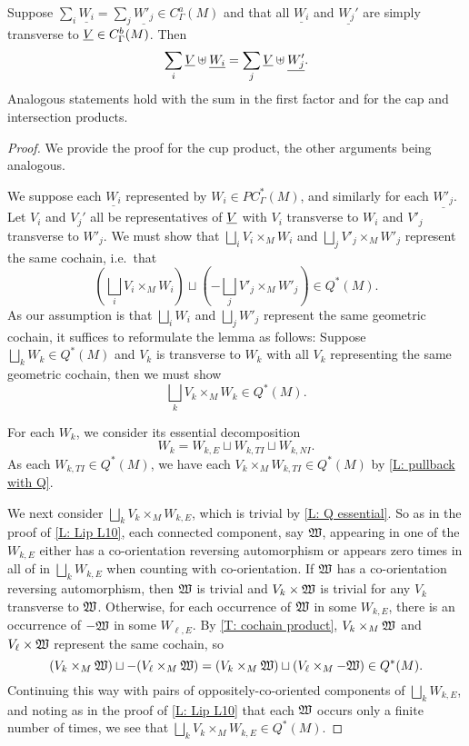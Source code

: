 \begin{proposition}\label{P: multicup}
Suppose $\sum_i \underline{W_i}=\sum_j \underline{W'_j}\in C_\Gamma^a(M)$ and that all $\underline{W_i}$ and $\underline{W_j'}$ are simply transverse to $\underline{V}\in C_\Gamma^b(M)$. Then $$\sum_i \underline{V} \uplus \underline{W_i}=\sum_j \underline{V}\uplus \underline{W'_j}.$$
Analogous statements hold with the sum in the first factor and for the cap and intersection products.
\end{proposition}
\begin{proof}
We provide the proof for the cup product, the other arguments being analogous.

We suppose each $\underline{W_i}$ represented by $W_i\in PC^*_\Gamma(M)$, and similarly for each $\underline{W'_j}$. Let $V_i$ and $V_j'$ all be representatives of $\underline{V}$ with $V_i$ transverse to $W_i$ and $V'_j$ transverse to $W'_j$. We must show that $\bigsqcup_i V_i\times_M W_i$ and $\bigsqcup_j V'_j\times_MW'_j$ represent the same cochain, i.e.\ that $$\left(\bigsqcup_i V_i\times_M W_i\right) \sqcup \left(-\bigsqcup_j V'_j\times_MW'_j\right)\in Q^*(M).$$
As our assumption is that $\bigsqcup_i W_i$ and $\bigsqcup_j W'_j$ represent the same geometric cochain, it suffices to reformulate the lemma as follows: Suppose $\bigsqcup_k W_k\in Q^*(M)$ and $V_k$ is transverse to $W_k$ with all $V_k$ representing the same geometric cochain, then we must show
 $$\bigsqcup_k V_k\times_M W_k \in Q^*(M).$$

For each $W_k$, we consider its essential decomposition $$W_k=W_{k,E}\sqcup W_{k,TI}\sqcup W_{k,NI}.$$
As each $W_{k,TI}\in Q^*(M)$, we have each $V_k\times_M W_{k,TI}\in Q^*(M)$ by \cref{L: pullback with Q}.

We next consider $\bigsqcup_k V_k\times_MW_{k,E}$, which is trivial by \cref{L: Q essential}. So as in the proof of \cref{L: Lip L10}, each connected component, say $\mathfrak W$, appearing in one of the $W_{k,E}$ either has a co-orientation reversing automorphism or appears zero times in all of in $\bigsqcup_k W_{k,E}$ when counting with co-orientation. If $\mathfrak W$ has a co-orientation reversing automorphism, then $\mathfrak W$ is trivial and $V_k\times \mathfrak W$ is trivial for any $V_k$ transverse to $\mathfrak W$. Otherwise, for each occurrence of $\mathfrak W$ in some $W_{k,E}$, there is an occurrence of $-\mathfrak W$ in some $W_{\ell,E}$. By \cref{T: cochain product}, $V_k\times_M\mathfrak W$ and $V_\ell\times \mathfrak W$ represent the same cochain, so
$$(V_k\times_M\mathfrak W)\sqcup -(V_\ell\times_M\mathfrak W)=(V_k\times_M\mathfrak W)\sqcup(V_\ell\times_M-\mathfrak W)\in Q^*(M).$$
Continuing this way with pairs of oppositely-co-oriented components of $\bigsqcup_k W_{k,E}$, and noting as in the proof of \cref{L: Lip L10} that each $\mathfrak W$ occurs only a finite number of times, we see that $\bigsqcup_k V_k\times_MW_{k,E}\in Q^*(M)$.


\end{proof}
